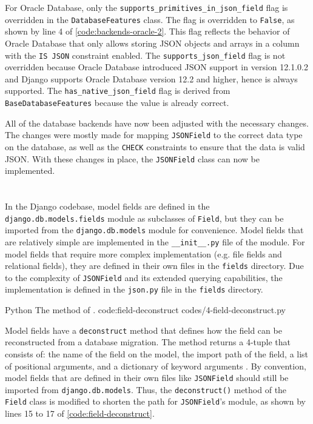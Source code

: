 For Oracle Database, only the \verb|supports_primitives_in_json_field| flag is
overridden in the \verb|DatabaseFeatures| class. The flag is overridden to
\verb|False|, as shown by line 4 of \autoref{code:backends-oracle-2}. This flag
reflects the behavior of Oracle Database that only allows storing JSON objects
and arrays in a column with the \verb|IS JSON| constraint enabled. The
\verb|supports_json_field| flag is not overridden because Oracle Database
introduced JSON support in version 12.1.0.2 and Django supports Oracle Database
version 12.2 and higher, hence  is always supported. The
\verb|has_native_json_field| flag is derived from \verb|BaseDatabaseFeatures|
because the value is already correct.

All of the database backends have now been adjusted with the necessary changes.
The changes were mostly made for mapping \verb|JSONField| to the correct data
type on the database, as well as the \verb|CHECK| constraints to ensure that
the data is valid JSON. With these changes in place, the \verb|JSONField| class
can now be implemented.

\section{}

In the Django codebase, model fields are defined in the
\verb|django.db.models.fields| module as subclasses of \verb|Field|, but they
can be imported from the \verb|django.db.models| module for convenience. Model
fields that are relatively simple are implemented in the \verb|__init__.py|
file of the module. For model fields that require more complex implementation
(e.g. file fields and relational fields), they are defined in their own files
in the \verb|fields| directory. Due to the complexity of \verb|JSONField| and
its extended querying capabilities, the implementation is defined in the
\verb|json.py| file in the \verb|fields| directory.

\listing
{Python}
{The  method of .}
{code:field-deconstruct}
{codes/4-field-deconstruct.py}

Model fields have a \verb|deconstruct| method that defines how the field can be
reconstructed from a database migration. The method returns a 4-tuple that
consists of: the name of the field on the model, the import path of the field,
a list of positional arguments, and a dictionary of keyword arguments
\cite{django:model_fields}. By convention, model fields that are defined in
their own files like \verb|JSONField| should still be imported from
\verb|django.db.models|. Thus, the \verb|deconstruct()| method of the
\verb|Field| class is modified to shorten the path for \verb|JSONField|'s
module, as shown by lines 15 to 17 of \autoref{code:field-deconstruct}.

